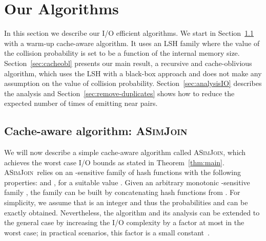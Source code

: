 \documentclass{llncs}
\newcommand{\ASimJoin}{\textsc{ASimJoin}}
\begin{document}
\section{Our Algorithms}\label{sec:OurAlgorithms}

In this section we describe our I/O efficient algorithms.
We start in Section~\ref{sec:simple} with a warm-up cache-aware algorithm. It  uses an LSH family where the value of the collision probability is set to be a function of the internal memory size.
Section~\ref{sec:cacheobl} presents our main result, a recursive and cache-oblivious algorithm, which uses the LSH with a black-box approach and does not make any assumption on the value of collision probability. 
Section~\ref{sec:analysisIO} describes the analysis and Section~\ref{sec:remove-duplicates} shows how to reduce the expected number of times of emitting near pairs. 

\subsection{Cache-aware algorithm: \ASimJoin\ }\label{sec:simple}

We will now describe a simple cache-aware algorithm called \ASimJoin, which achieves the {worst case} I/O bounds as stated in Theorem~\ref{thm:main}. 
\ASimJoin\ relies on an -sensitive family  of hash functions with the following properties:  and , for a suitable value . 
Given an arbitrary monotonic -sensitive family , the family  can be built by concatenating  hash functions from . 
For simplicity, we assume that  is an integer and thus the probabilities  and  can be exactly obtained. 
Nevertheless, the algorithm and its analysis can be extended to the general case by increasing the I/O complexity by a factor at most  in the worst case; in practical scenarios, this factor is a small constant~\cite{Broder_NETWORK97,Datar_SOCG04,Gionis_VLDB99}.
\end{document}
